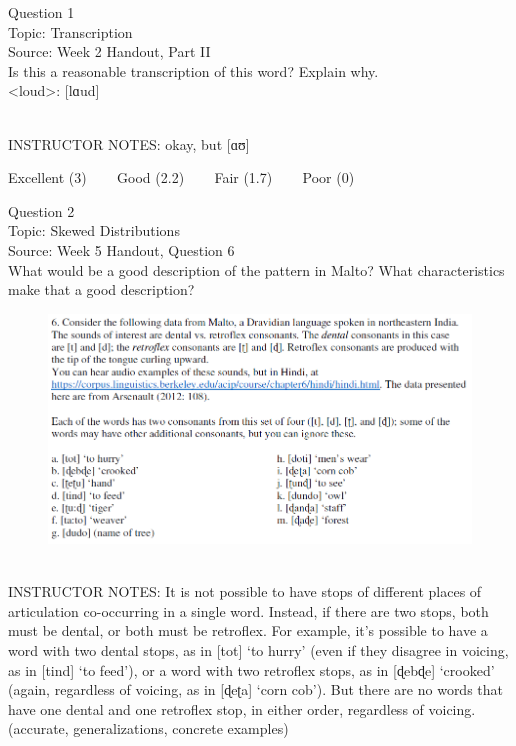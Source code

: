 \documentclass[12pt]{article}
\begin{document}
{\large Question 1}\\

Topic: Transcription\\
Source: Week 2 Handout, Part II\\

Is this a reasonable transcription of this word? Explain why.\\

<loud>: {[lɑud]}


~\\
INSTRUCTOR NOTES: okay, but [ɑʊ]


\vfill
Excellent (3) ~~~ Good (2.2) ~~~ Fair (1.7) ~~~ Poor (0)
\newpage

{\large Question 2}\\

Topic: Skewed Distributions\\
Source: Week 5 Handout, Question 6\\

What would be a good description of the pattern in Malto? What characteristics make that a good description?\\

\begin{figure}[H]
\includegraphics{../images/malto.png}
\end{figure}

~\\
INSTRUCTOR NOTES: It is not possible to have stops of different places of articulation co-occurring in a single word. Instead, if there are two stops, both must be dental, or both must be retroflex. For example, it’s possible to have a word with two dental stops, as in [tot] ‘to hurry’ (even if they disagree in voicing, as in [tind] ‘to feed’), or a word with two retroflex stops, as in [ɖebɖe] ‘crooked’ (again, regardless of voicing, as in [ɖeʈa] ‘corn cob’). But there are no words that have one dental and one retroflex stop, in either order, regardless of voicing. (accurate, generalizations, concrete examples)
\end{document}

